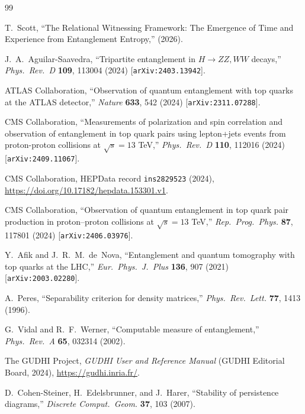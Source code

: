 \documentclass[11pt,a4paper]{article}
\theoremstyle{definition}
\begin{document}
\begin{thebibliography}{99}

T.~Scott, ``The Relational Witnessing Framework: The Emergence of Time and Experience from Entanglement Entropy,'' (2026).

J.~A.~Aguilar-Saavedra, ``Tripartite entanglement in $H \to ZZ, WW$ decays,'' \emph{Phys.~Rev.~D} \textbf{109}, 113004 (2024) [\texttt{arXiv:2403.13942}].

ATLAS Collaboration, ``Observation of quantum entanglement with top quarks at the ATLAS detector,'' \emph{Nature} \textbf{633}, 542 (2024) [\texttt{arXiv:2311.07288}].

CMS Collaboration, ``Measurements of polarization and spin correlation and observation of entanglement in top quark pairs using lepton+jets events from proton-proton collisions at $\sqrt{s} = 13$ TeV,'' \emph{Phys.~Rev.~D} \textbf{110}, 112016 (2024) [\texttt{arXiv:2409.11067}].

CMS Collaboration, HEPData record \texttt{ins2829523} (2024), \url{https://doi.org/10.17182/hepdata.153301.v1}.

CMS Collaboration, ``Observation of quantum entanglement in top quark pair production in proton--proton collisions at $\sqrt{s} = 13$ TeV,'' \emph{Rep.~Prog.~Phys.} \textbf{87}, 117801 (2024) [\texttt{arXiv:2406.03976}].

Y.~Afik and J.~R.~M.~de~Nova, ``Entanglement and quantum tomography with top quarks at the LHC,'' \emph{Eur.~Phys.~J.~Plus} \textbf{136}, 907 (2021) [\texttt{arXiv:2003.02280}].

A.~Peres, ``Separability criterion for density matrices,'' \emph{Phys.~Rev.~Lett.} \textbf{77}, 1413 (1996).

G.~Vidal and R.~F.~Werner, ``Computable measure of entanglement,'' \emph{Phys.~Rev.~A} \textbf{65}, 032314 (2002).

The GUDHI Project, \emph{GUDHI User and Reference Manual} (GUDHI Editorial Board, 2024), \url{https://gudhi.inria.fr/}.

D.~Cohen-Steiner, H.~Edelsbrunner, and J.~Harer, ``Stability of persistence diagrams,'' \emph{Discrete Comput.~Geom.} \textbf{37}, 103 (2007).



\end{thebibliography}
\end{document}
